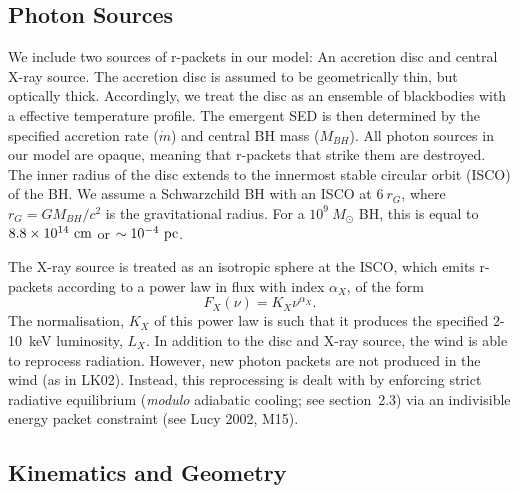 \documentclass[useAMS,usenatbib]{mn2e_x}
\begin{document}
\subsection{Photon Sources}
\label{sec:photon_sources}

We include two sources of r-packets in our model:
An accretion disc and central X-ray source.
The accretion disc is assumed to be geometrically thin, but optically thick.
Accordingly, we treat the disc as an ensemble of blackbodies with a 
\cite{shakurasunyaev1973} effective temperature profile. 
The emergent SED is then determined by the specified accretion rate ($\dot{m}$)
and central BH mass ($M_{BH}$).
All photon sources in our model are opaque, meaning
that r-packets that strike them are destroyed.
The inner radius of the disc extends to the innermost 
stable circular orbit (ISCO) of the BH. 
We assume a Schwarzchild BH with an ISCO at $6~r_G$, where 
$r_G = GM_{BH}/c^2$ is the gravitational radius.
For a $10^9~M_\odot$ BH, this is equal to $8.8\times10^{14}~{\rm cm}$ 
or $\sim10^{-4}~{\rm pc}$.  


The X-ray source is treated as an isotropic sphere at the ISCO,
which emits r-packets according to a power law in flux with index $\alpha_X$, of the form
\begin{equation}
F_X (\nu) = K_X \nu^{\alpha_X}.
\end{equation}
The normalisation, $K_X$ of this power law is such that it 
produces the specified 2-10~keV luminosity, $L_X$.
In addition to the disc and X-ray source, 
the wind is able to reprocess radiation. However, new 
photon packets are not produced in the wind (as in LK02). 
Instead, this reprocessing is dealt with by enforcing strict
radiative equilibrium ({\em modulo} adiabatic cooling; see section~2.3)
via an indivisible energy packet
constraint (see Lucy 2002, M15).  

\subsection{Kinematics and Geometry}
\end{document}
